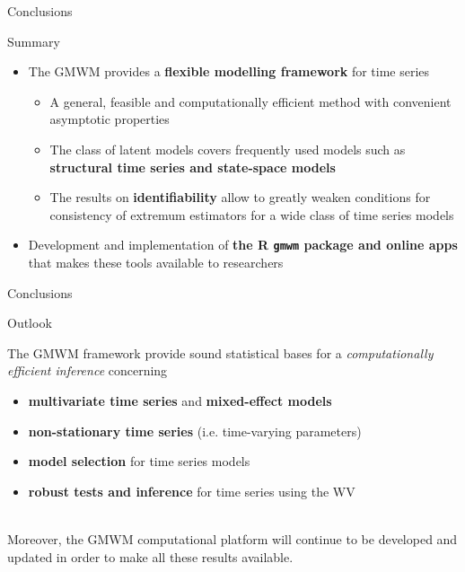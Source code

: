 \documentclass[envcountsect,usenames,dvipsnames]{beamer}
\theoremstyle{mystyle}
\begin{document}
\begin{frame}{Conclusions}

\begin{block}{Summary}
\begin{itemize}
  \item The GMWM provides a \textbf{flexible modelling framework} for time series
  \begin{itemize}
    \item A general, feasible and computationally efficient method with convenient asymptotic properties
    \item The class of latent models covers frequently used models such as \textbf{structural time series and state-space models}
    \item The results on \textbf{identifiability} allow to greatly weaken conditions for consistency of extremum estimators for a wide class of time series models
  \end{itemize}
  \item Development and implementation of \textbf{the R \texttt{gmwm} package and online apps} that makes these tools available to researchers
\end{itemize}
\end{block}
\end{frame}

\begin{frame}{Conclusions}
\begin{block}{Outlook}

The GMWM framework provide sound statistical bases for a \textit{computationally efficient inference} concerning
\begin{itemize}
    \item \textbf{multivariate time series} and \textbf{mixed-effect models}
    \item \textbf{non-stationary time series} (i.e. time-varying parameters)
    \item \textbf{model selection} for time series models
    \item \textbf{robust tests and inference} for time series using the WV
\end{itemize}\\[0.3cm]

Moreover, the GMWM computational platform will continue to be developed and updated in order to make all these results available.

\end{block}
\end{frame}
\end{document}
